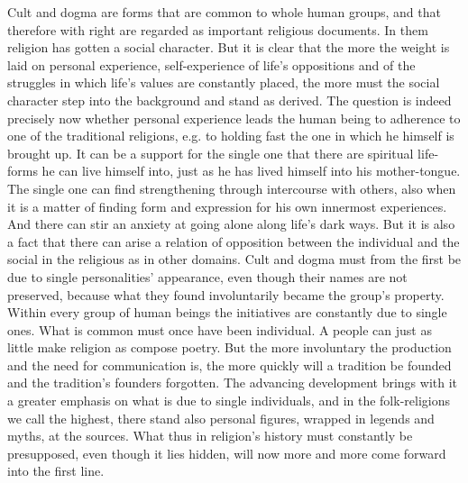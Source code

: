 \documentclass[12pt,a4paper]{book}
\newcommand{\opage}[1]{\marginnote{\footnotesize\textit{[#1]}}}
\begin{document}
Cult and dogma are forms that are common to whole human groups, and that therefore with right are regarded
as important religious documents. In them religion has gotten a social character. But it is clear that the
more the weight is laid on personal experience, self-experience of life's oppositions and of the struggles
in which life's values are constantly placed, the more must the social character step into the background
and stand as derived. The question is indeed precisely now whether personal experience leads the human
being to adherence to one of the traditional religions, e.g. to holding fast the one in which he himself is
brought up. It can be a support for the single one that there are spiritual life-forms he can live himself
into, just as he has lived himself into his mother-tongue. The single one can find strengthening through
intercourse \opage{382}with others, also when it is a matter of finding form and expression for his own innermost
experiences. And there can stir an anxiety at going alone along life's dark ways. But it is also a fact that
there can arise a relation of opposition between the individual and the social in the religious as in other
domains. Cult and dogma must from the first be due to single personalities' appearance, even though their
names are not preserved, because what they found involuntarily became the group's property. Within every
group of human beings the initiatives are constantly due to single ones. What is common must once have been
individual. A people can just as little make religion as compose poetry. But the more involuntary the production and
the need for communication is, the more quickly will a tradition be founded and the tradition's founders
forgotten. The advancing development brings with it a greater emphasis on what is due to single individuals,
and in the folk-religions we call the highest, there stand also personal figures, wrapped in legends and
myths, at the sources. What thus in religion's history must constantly be presupposed, even though it lies
hidden, will now more and more come forward into the first line.
\end{document}
